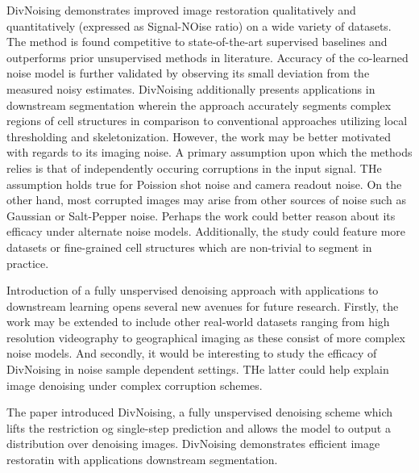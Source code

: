 \documentclass[11pt,letterpaper]{article}
\begin{document}
DivNoising demonstrates improved image restoration qualitatively and quantitatively (expressed as Signal-NOise ratio) on a wide variety of datasets. The method is found competitive to state-of-the-art supervised baselines and outperforms prior unsupervised methods in literature. Accuracy of the co-learned noise model is further validated by observing its small deviation from the measured noisy estimates. DivNoising additionally presents applications in downstream segmentation wherein the approach accurately segments complex regions of cell structures in comparison to conventional approaches utilizing local thresholding and skeletonization. However, the work may be better motivated with regards to its imaging noise. A primary assumption upon which the methods relies is that of independently occuring corruptions in the input signal. THe assumption holds true for Poission shot noise and camera readout noise. On the other hand, most corrupted images may arise from other sources of noise such as Gaussian or Salt-Pepper noise. Perhaps the work could better reason about its efficacy under alternate noise models. Additionally, the study could feature more datasets or fine-grained cell structures which are non-trivial to segment in practice. 

Introduction of a fully unspervised denoising approach with applications to downstream learning opens several new avenues for future research. Firstly, the work may be extended to include other real-world datasets ranging from high resolution videography to geographical imaging as these consist of more complex noise models. And secondly, it would be interesting to study the efficacy of DivNoising in noise sample dependent settings. THe latter could help explain image denoising under complex corruption schemes. 

The paper introduced DivNoising, a fully unspervised denoising scheme which lifts the restriction og single-step prediction and allows the model to output a distribution over denoising images. DivNoising demonstrates efficient image restoratin with applications downstream segmentation. 
\end{document}
